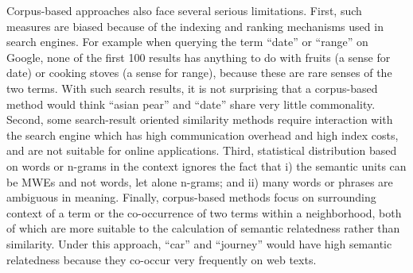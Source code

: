 Corpus-based approaches also face several serious limitations.
First, such measures are biased because of the indexing and
ranking mechanisms used in search engines.
For example when querying the term ``date''
or ``range''
on Google, none of the first 100 results has anything to do with
fruits (a sense for date) or cooking stoves (a sense for range),
because these are rare senses of the two terms.
With such search results, it is not surprising that a corpus-based
method would think ``asian pear'' and ``date'' share very little commonality.
Second, some search-result oriented similarity methods require
interaction with the search engine which has high communication overhead
and high index costs, and are not suitable for online applications.
Third, statistical distribution based on words or n-grams in the
context ignores the fact that i) the semantic units can be MWEs and not
words, let alone n-grams; and ii) many words or phrases are ambiguous
in meaning. %
Finally, corpus-based methods focus on
surrounding context of a term or the co-occurrence of two terms within
a neighborhood, both of which are more suitable to the calculation of
semantic relatedness rather than similarity.  Under this approach,
``car'' and ``journey'' would have high semantic relatedness because
they co-occur very frequently on web texts.

